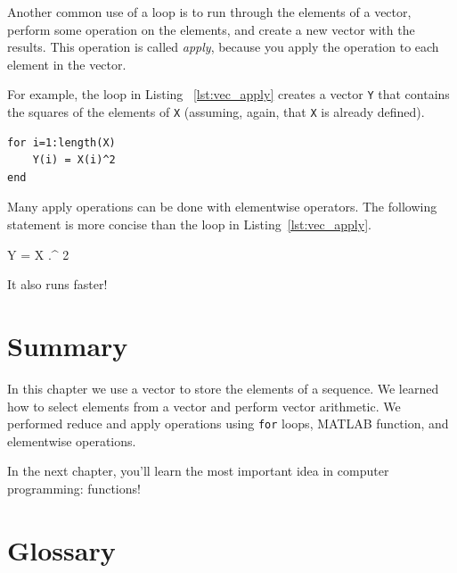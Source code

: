 Another common use of a loop is to run through the elements of
a vector, perform some operation on the elements, and create
a new vector with the results.  This operation is called
\emph{apply}, because you apply the operation to each element in
the vector.


For example, the loop in Listing ~\ref{lst:vec_apply} creates a vector {\tt Y} that
contains the squares of the elements of {\tt X} (assuming, again, that {\tt X} is already defined).

\begin{lstlisting}[caption={Making a new vector Y by squaring the elements in X }, label={lst:vec_apply}]
for i=1:length(X)
    Y(i) = X(i)^2
end
\end{lstlisting}

Many apply operations can be done with elementwise operators.
The following statement is more concise than the loop in
Listing~\ref{lst:vec_apply}.

\begin{code}
Y = X .^ 2
\end{code}

It also runs faster!


\section{Summary}

In this chapter we use a vector to store the elements of a sequence.  We learned how to select elements from a vector and perform vector arithmetic.  We performed reduce and apply operations using {\tt for} loops, MATLAB function, and elementwise operations.

In the next chapter, you'll learn the most important idea in computer programming: functions!


\section{Glossary}

